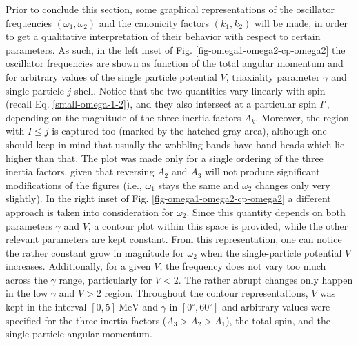 Prior to conclude this section, some graphical representations of the oscillator frequencies $(\omega_1,\omega_2)$ and the canonicity factors $(k_1,k_2)$ will be made, in order to get a qualitative interpretation of their behavior with respect to certain parameters. As such, in the left inset of Fig. \ref{fig-omega1-omega2-cp-omega2} the oscillator frequencies are shown as function of the total angular momentum and for arbitrary values of the single particle potential $V$, triaxiality parameter $\gamma$ and single-particle $j$-shell. Notice that the two quantities vary linearly with spin (recall Eq. \ref{small-omega-1-2}), and they also intersect at a particular spin $I'$, depending on the magnitude of the three inertia factors $A_k$. Moreover, the region with $I\leq j$ is captured too (marked by the hatched gray area), although one should keep in mind that usually the wobbling bands have band-heads which lie higher than that. The plot was made only for a single ordering of the three inertia factors, given that reversing $A_2$ and $A_3$ will not produce significant modifications of the figures (i.e., $\omega_1$ stays the same and $\omega_2$ changes only very slightly). In the right inset of Fig. \ref{fig-omega1-omega2-cp-omega2} a different approach is taken into consideration for $\omega_2$. Since this quantity depends on both parameters $\gamma$ and $V$, a contour plot within this space is provided, while the other relevant parameters are kept constant. From this representation, one can notice the rather constant grow in magnitude for $\omega_2$ when the single-particle potential $V$ increases. Additionally, for a given $V$, the frequency does not vary too much across the $\gamma$ range, particularly for $V<2$. The rather abrupt changes only happen in the low $\gamma$ and $V>2$ region. Throughout the contour representations, $V$ was kept in the interval $[0,5]\ \text{MeV}$ and $\gamma$ in $[0^\circ,60^\circ]$ and arbitrary values were specified for the three inertia factors ($A_3>A_2>A_1$), the total spin, and the single-particle angular momentum.
